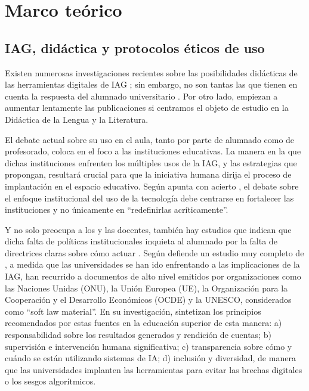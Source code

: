 \documentclass[spanish]{textolivre}
\begin{document}
\section{Marco teórico}\label{sec-normas}

\subsection{IAG, didáctica y protocolos éticos de uso}
Existen numerosas investigaciones recientes sobre las posibilidades didácticas de las herramientas digitales de IAG \cite{SanchezVera2024,UbalCamachoTambascoMartinezGarciaCorrea2023,CarrionSalinasAndradeVargas2024,CervantesBarriosMonteceMoranteMeraMedina2024,Sanz2024,MiguezGordillo2025,PuentesAguillonFernandezMoralesNinoVega2025}; sin embargo, no son tantas las que tienen en cuenta la respuesta del alumnado universitario \cite{MartinMarchante2022,Gragera2024,Lindin2024}. Por otro lado, empiezan a aumentar lentamente las publicaciones \cite{CuestaGarciaGonzalezArguelloPujola2024,MartinMarchante2022,RoviraColladoMartinezCarratalaMiras2024,SanchezPena2024} si centramos el objeto de estudio en la Didáctica de la Lengua y la Literatura.

El debate actual sobre su uso en el aula, tanto por parte de alumnado como de profesorado, coloca en el foco a las instituciones educativas. La manera en la que dichas instituciones enfrenten los múltiples usos de la IAG, y las estrategias que propongan, resultará crucial para que la iniciativa humana dirija el proceso de implantación en el espacio educativo. Según apunta con acierto \textcite{Castaneda2019}, el debate sobre el enfoque institucional del uso de la tecnología debe centrarse en fortalecer las instituciones y no únicamente en “redefinirlas acríticamente”.

Y no solo preocupa a los y las docentes, también hay estudios que indican que dicha falta de políticas institucionales inquieta al alumnado por la falta de directrices claras sobre cómo actuar \cite{ChanHu2023}. Según defiende un estudio muy completo de \textcite{DabisCsaki2024}, a medida que las universidades se han ido enfrentando a las implicaciones de la IAG, han recurrido a documentos de alto nivel emitidos por organizaciones como las Naciones Unidas (ONU), la Unión Europea (UE), la Organización para la Cooperación y el Desarrollo Económicos (OCDE) y la UNESCO, considerados como “soft law material”. En su investigación, \textcite{DabisCsaki2024} sintetizan los principios recomendados por estas fuentes en la educación superior de esta manera: a) responsabilidad sobre los resultados generados y rendición de cuentas; b) supervisión e intervención humana significativa; c) transparencia sobre cómo y cuándo se están utilizando sistemas de IA; d) inclusión y diversidad, de manera que las universidades implanten las herramientas para evitar las brechas digitales o los sesgos algorítmicos.
\end{document}
